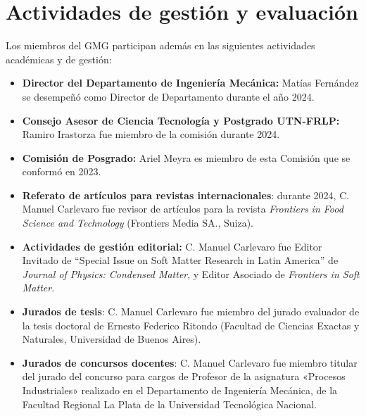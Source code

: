 \documentclass[a4paper,11pt,twoside,final,titlepage,onecolumn,openright]{report}
\begin{document}
\section{Actividades de gestión y evaluación}

Los miembros del GMG participan además en las siguientes actividades académicas y de gestión:

\begin{itemize}
    \item \textbf{Director del Departamento de Ingeniería Mecánica:} Matías Fernández se desempeñó como Director de Departamento durante el año 2024.

  \item \textbf{Consejo Asesor de Ciencia Tecnología y Postgrado UTN-FRLP:} Ramiro Irastorza fue miembro de la comisión durante 2024. 

\item \textbf{Comisión de Posgrado:} Ariel Meyra es miembro de esta Comisión que se conformó en 2023.
  
\item \textbf{Referato de artículos para revistas internacionales}: durante 2024, C. Manuel Carlevaro fue revisor de artículos para la revista \textit{Frontiers in Food Science and Technology} (Frontiers Media SA., Suiza).
 
\item \textbf{Actividades de gestión editorial:} C. Manuel Carlevaro fue Editor Invitado de ``Special Issue on Soft Matter Research in Latin America'' de \textit{Journal of Physics: Condensed Matter}, y Editor Asociado de \textit{Frontiers in Soft Matter}.
 

\item \textbf{Jurados de tesis}: C. Manuel Carlevaro fue miembro del jurado evaluador de la tesis doctoral de Ernesto Federico Ritondo (Facultad de Ciencias Exactas y Naturales, Universidad de Buenos Aires).

\item \textbf{Jurados de concursos docentes}: C. Manuel Carlevaro fue miembro titular del jurado del concurso para cargos de Profesor de la asignatura «Procesos Industriales» realizado en el Departamento de Ingeniería Mecánica, de la Facultad Regional La Plata de la Universidad Tecnológica Nacional.


\end{itemize}
\end{document}
